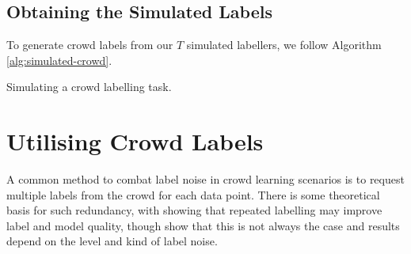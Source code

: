     \subsection{Obtaining the Simulated Labels}
    \label{sec:obtaining-simulated-labels}

        To generate crowd labels from our $T$ simulated labellers, we follow
        Algorithm \ref{alg:simulated-crowd}.

        \begin{algorithm}[H]

            \caption{Simulating a crowd labelling task.}
            \label{alg:simulated-crowd}
        \end{algorithm}

\section{Utilising Crowd Labels}
\label{sec:crowd-labels}


    A common method to combat label noise in crowd learning scenarios is to
    request multiple labels from the crowd for each data point.  There is some
    theoretical basis for such redundancy, with \citet{sheng08} showing that
    repeated labelling may improve label and model quality, though \citet{lin14}
    show that this is not always the case and results depend on the level and
    kind of label noise.

